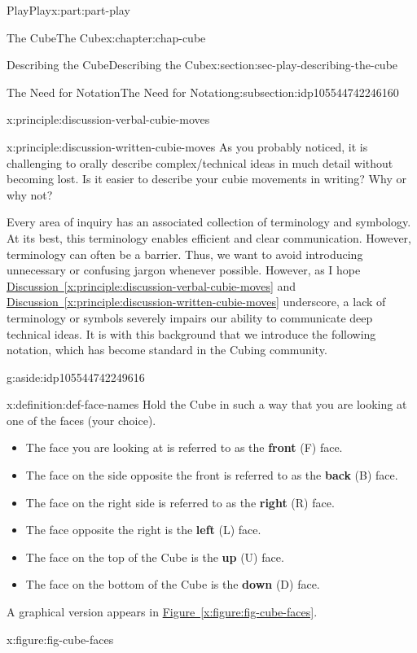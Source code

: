 \documentclass[oneside,10pt,]{book}
\newcommand{\xreffont}{\relax}
\newcommand{\terminology}[1]{\textbf{#1}}
\numberwithin{equation}{section}
\begin{document}
\begin{partptx}{Play}{}{Play}{}{}{x:part:part-play}
\begin{chapterptx}{The Cube}{}{The Cube}{}{}{x:chapter:chap-cube}
\begin{sectionptx}{Describing the Cube}{}{Describing the Cube}{}{}{x:section:sec-play-describing-the-cube}
\begin{subsectionptx}{The Need for Notation}{}{The Need for Notation}{}{}{g:subsection:idp105544742246160}
\begin{principle}{}{}{x:principle:discussion-verbal-cubie-moves}
\end{principle}
\begin{principle}{}{}{x:principle:discussion-written-cubie-moves}%
As you probably noticed, it is challenging to orally describe complex\slash{}technical ideas in much detail without becoming lost. Is it easier to describe your cubie movements in writing? Why or why not?%
\end{principle}
Every area of inquiry has an associated collection of terminology and symbology. At its best, this terminology enables efficient and clear communication. However, terminology can often be a barrier. Thus, we want to avoid introducing unnecessary or confusing jargon whenever possible. However, as I hope \hyperref[x:principle:discussion-verbal-cubie-moves]{Discussion~{\xreffont\ref{x:principle:discussion-verbal-cubie-moves}}} and \hyperref[x:principle:discussion-written-cubie-moves]{Discussion~{\xreffont\ref{x:principle:discussion-written-cubie-moves}}} underscore, a lack of terminology or symbols severely impairs our ability to communicate deep technical ideas. It is with this background that we introduce the following notation, which has become standard in the Cubing community.\begin{aside}{}{g:aside:idp105544742249616}%
\end{aside}
%
\begin{definition}{}{x:definition:def-face-names}%
Hold the Cube in such a way that you are looking at one of the faces (your choice).%
\begin{itemize}[label=\textbullet]
\item{}The face you are looking at is referred to as the \terminology{front} (F) face.%
\item{}The face on the side opposite the front is referred to as the \terminology{back} (B) face.%
\item{}The face on the right side is referred to as the \terminology{right} (R) face.%
\item{}The face opposite the right is the \terminology{left} (L) face.%
\item{}The face on the top of the Cube is the \terminology{up} (U) face.%
\item{}The face on the bottom of the Cube is the \terminology{down} (D) face.%
\end{itemize}
A graphical version appears in \hyperref[x:figure:fig-cube-faces]{Figure~{\xreffont\ref{x:figure:fig-cube-faces}}}.%
\begin{figureptx}{}{x:figure:fig-cube-faces}{}%

\end{figureptx}
\end{definition}
\end{subsectionptx}
\end{sectionptx}
\end{chapterptx}
\end{partptx}
\end{document}
